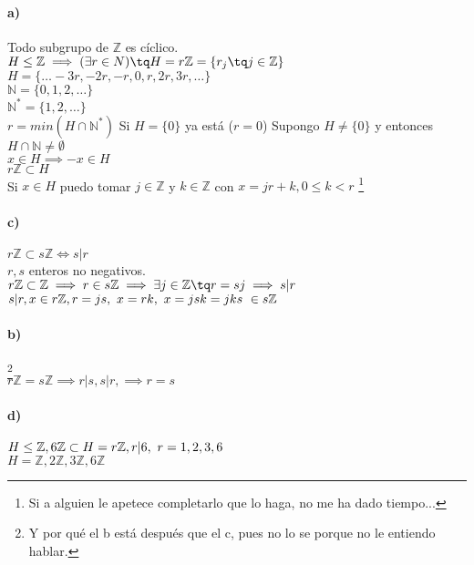 \documentclass{apuntes}
\begin{document}
\paragraph{a)}
Todo subgrupo de $\mathbb{Z}$ es cíclico.\\
$H\leq \mathbb{Z} \implies (\exists r \in N) \tq H = r\mathbb{Z} = \{ r_j\tq j\in \mathbb{Z}\} $\\
$H = \{ \hdots -3r, -2r, -r, 0, r, 2r, 3r, \hdots \}$\\
$\mathbb{N} = \{ 0,1,2,\hdots \}$\\
$\mathbb{N^*} = \{ 1,2,\hdots \}$\\
$r = min (H\cap \mathbb{N}^*)$
Si $H = \{ 0 \}$ ya está ($r = 0$)
Supongo $H \neq \{ 0 \}$ y entonces $H\cap \mathbb{N} \neq \emptyset$\\
$x\in H\implies -x \in H$\\
$r\mathbb{Z} \subset H$\\
Si $x\in H$ puedo tomar $j\in \mathbb{Z}$ y $k\in \mathbb{Z}$ con $x=jr+k, 0\leq k < r$ \footnote{Si a alguien le apetece completarlo que lo haga, no me ha dado tiempo...}

\paragraph{c)}
$r\mathbb{Z} \subset s\mathbb{Z} \iff s|r$\\
$r, s$ enteros no negativos.\\
$r\mathbb{Z} \subset \mathbb{Z} \implies r\in s\mathbb{Z} \implies \exists j \in \mathbb{Z} \tq r=sj \implies s|r$\\
$s|r, x\in r\mathbb{Z},\\ r=js,\ x=rk,\ x=jsk=jks\ \in s\mathbb{Z}$

\paragraph{b)}\footnote{Y por qué el b está después que el c, pues no lo se porque no le entiendo hablar.}\\
$r\mathbb{Z} = s\mathbb{Z} \implies r|s, s|r, \implies r=s$

\paragraph{d)}
$H\leq \mathbb{Z}, 6\mathbb{Z} \subset H = r\mathbb{Z},\\
r|6,\ r=1,2,3,6$\\
$H = \mathbb{Z}, 2\mathbb{Z}, 3\mathbb{Z}, 6\mathbb{Z}$
\end{document}
